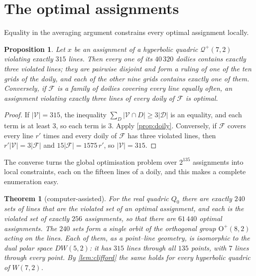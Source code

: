 \documentclass[11pt]{article}
\newtheorem{theorem}{Theorem}
\newtheorem{proposition}[proposition]{Proposition}
\theoremstyle{definition}
\theoremstyle{remark}
\newcommand{\Qp}{\mathcal{Q}^{+}}
\newcommand{\GO}{\mathrm{O}}
\begin{document}
\section{The optimal assignments}\label{sec:optimal}

Equality in the averaging argument constrains every optimal assignment locally.

\begin{proposition}\label{prop:ruling}
Let $x$ be an assignment of a hyperbolic quadric $\Qp(7,2)$ violating exactly $315$ lines. Then every one of its $40\,320$ doilies contains exactly three violated lines; they are pairwise disjoint and form a ruling of one of the ten grids of the doily, and each of the other nine grids contains exactly one of them.
Conversely, if $\mathcal F$ is a family of doilies covering every line equally often, an assignment violating exactly three lines of every doily of $\mathcal F$ is optimal.
\end{proposition}
\begin{proof}
If $|\mathcal V|=315$, the inequality $\sum_D|\mathcal V\cap D|\ge3|\mathcal D|$ is an equality, and each term is at least $3$, so each term is $3$. Apply \cref{prop:doily}.
Conversely, if $\mathcal F$ covers every line $r'$ times and every doily of $\mathcal F$ has three violated lines, then $r'|\mathcal V|=3|\mathcal F|$ and $15|\mathcal F|=1575\,r'$, so $|\mathcal V|=315$.
\end{proof}

The converse turns the global optimisation problem over $2^{135}$ assignments into local constraints, each on the fifteen lines of a doily, and this makes a complete enumeration easy.

\begin{theorem}[computer-assisted]\label{thm:dw}
For the real quadric $Q_0$ there are exactly $240$ sets of lines that are the violated set of an optimal assignment, and each is the violated set of exactly $256$ assignments, so that there are $61\,440$ optimal assignments.
The $240$ sets form a single orbit of the orthogonal group $\GO^+(8,2)$ acting on the lines.
Each of them, as a point--line geometry, is isomorphic to the dual polar space $DW(5,2)$: it has $315$ lines through all $135$ points, with $7$ lines through every point.
By \cref{lem:clifford} the same holds for every hyperbolic quadric of $W(7,2)$.
\end{theorem}
\end{document}
